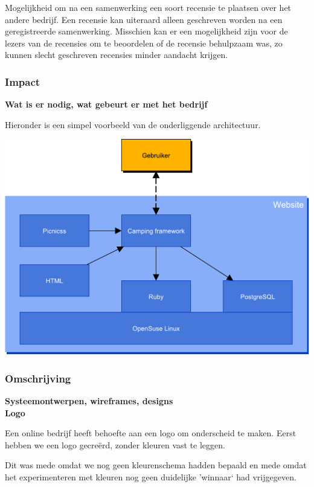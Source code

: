 Mogelijkheid om na een samenwerking een soort recensie te plaatsen
over het andere bedrijf. Een recensie kan uiteraard alleen geschreven
worden na een geregistreerde samenwerking. Misschien kan er een
mogelijkheid zijn voor de lezers van de recensies om te beoordelen of
de recensie behulpzaam was, zo kunnen slecht geschreven recensies
minder aandacht krijgen.

\subsubsection{Impact}
{\bf Wat is er nodig, wat gebeurt er met het bedrijf}

Hieronder is een simpel voorbeeld van de onderliggende architectuur.

\includegraphics[width=\textwidth]{img/websiteArchitecture}

\subsubsection{Omschrijving}

{\bf Systeemontwerpen, wireframes, designs} \\


{\bf Logo}

Een online bedrijf heeft behoefte aan een logo om onderscheid te maken.
Eerst hebben we een logo gecre\"erd, zonder kleuren vast te leggen.



Dit was mede omdat we nog geen kleurenschema hadden bepaald
en mede omdat het experimenteren met kleuren nog geen duidelijke 'winnaar` had vrijgegeven.


